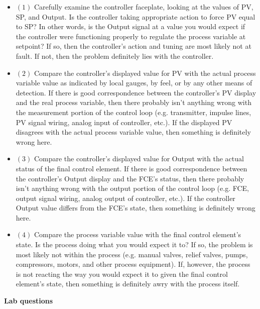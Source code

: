 \begin{itemize}
\item{$(1)$}  Carefully examine the controller faceplate, looking at the values of PV, SP, and Output.  Is the controller taking appropriate action to force PV equal to SP?  In other words, is the Output signal at a value you would expect if the controller were functioning properly to regulate the process variable at setpoint?  If so, then the controller's action and tuning are most likely not at fault.  If not, then the problem definitely lies with the controller.
\item{$(2)$}  Compare the controller's displayed value for PV with the actual process variable value as indicated by local gauges, by feel, or by any other means of detection.  If there is good correspondence between the controller's PV display and the real process variable, then there probably isn't anything wrong with the measurement portion of the control loop (e.g. transmitter, impulse lines, PV signal wiring, analog input of controller, etc.).  If the displayed PV disagrees with the actual process variable value, then something is definitely wrong here.
\item{$(3)$}  Compare the controller's displayed value for Output with the actual status of the final control element.  If there is good correspondence between the controller's Output display and the FCE's status, then there probably isn't anything wrong with the output portion of the control loop (e.g. FCE, output signal wiring, analog output of controller, etc.).  If the controller Output value differs from the FCE's state, then something is definitely wrong here.
\item{$(4)$}  Compare the process variable value with the final control element's state.  Is the process doing what you would expect it to?  If so, the problem is most likely not within the process (e.g. manual valves, relief valves, pumps, compressors, motors, and other process equipment).  If, however, the process is not reacting the way you would expect it to given the final control element's state, then something is definitely awry with the process itself.
\end{itemize}






\vfil \eject

\noindent
{\bf Lab questions}

\vskip 5pt

